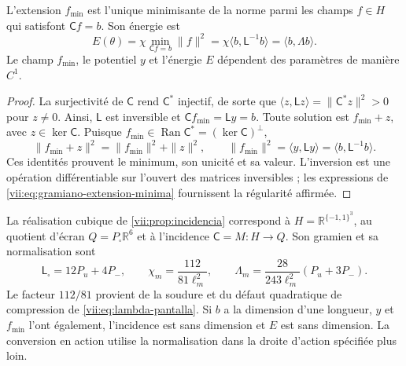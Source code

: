 \begin{proposition}
\label{vii:prop:minimo-parametrizado}
L'extension \(f_{\min}\) est l'unique minimisante de la norme parmi
les champs \(f\in H\) qui satisfont \(\mathsf C f=b\). Son énergie est
\begin{equation}
 E(\theta)=\chi\min_{\mathsf C f=b}\|f\|^2
 =\chi\langle b,\mathsf L^{-1}b\rangle
 =\langle b,\Lambda b\rangle.
 \label{vii:eq:energia-extension-minima}
\end{equation}
Le champ \(f_{\min}\), le potentiel \(y\) et l'énergie \(E\)
dépendent des paramètres de manière \(C^1\).
\end{proposition}

\begin{proof}
La surjectivité de \(\mathsf C\) rend \(\mathsf C^*\) injectif, de sorte que \(\langle z,\mathsf Lz\rangle=\|\mathsf C^*z\|^2>0\) pour \(z\ne0\). Ainsi, \(\mathsf L\) est inversible et \(\mathsf C f_{\min}=\mathsf L y=b\). Toute solution est \(f_{\min}+z\), avec \(z\in\ker\mathsf C\). Puisque \(f_{\min}\in\operatorname{Ran}\mathsf C^*=(\ker\mathsf C)^\perp\),
\[
 \|f_{\min}+z\|^2=\|f_{\min}\|^2+\|z\|^2,
 \qquad
 \|f_{\min}\|^2=\langle y,\mathsf L y\rangle
 =\langle b,\mathsf L^{-1}b\rangle.
\]
Ces identités prouvent le minimum, son unicité et sa valeur. L'inversion
est une opération différentiable sur l'ouvert des matrices inversibles ;
les expressions de \eqref{vii:eq:gramiano-extension-minima} fournissent
la régularité affirmée.
\end{proof}

La réalisation cubique de \ref{vii:prop:incidencia} correspond à
\(H=\mathbb R^{\{-1,1\}^3}\), au quotient d'écran
\(Q=P_\square\mathbb R^6\) et à l'incidence \(\mathsf C=M:H\to Q\).
Son gramien et sa normalisation sont
\begin{equation}
 \mathsf L_\square=12P_u+4P_-,\qquad
 \chi_m=\frac{112}{81\ell_m^2},\qquad
 \Lambda_m=\frac{28}{243\ell_m^2}(P_u+3P_-).
 \label{vii:eq:normalizacion-minimo-cubico}
\end{equation}
Le facteur \(112/81\) provient de la soudure et du défaut quadratique de compression de \eqref{vii:eq:lambda-pantalla}. Si \(b\) a la dimension d'une longueur, \(y\) et \(f_{\min}\) l'ont également, l'incidence est sans dimension et \(E\) est sans dimension. La conversion en action utilise la normalisation dans la droite d'action spécifiée plus loin.

